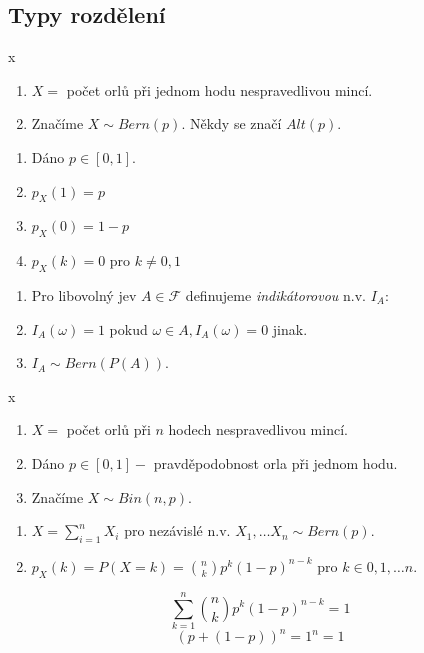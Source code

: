 \documentclass[../main.tex]{subfiles}
\begin{document}
\subsection{Typy rozdělení}
\begin{definition} {\color{white} x}
    \begin{enumerate}
        \item $X = $ počet orlů při jednom hodu nespravedlivou mincí.
        \item Značíme $X \sim Bern(p)$. Někdy se značí $Alt(p)$.
    \end{enumerate}

    \vspace{5mm}

    \begin{enumerate}
        \item Dáno $p \in [0,1]$.
        \item $p_X(1)=p$
        \item $p_X(0) = 1 - p$
        \item $p_X(k) = 0$ pro $k \neq 0,1$
    \end{enumerate}

    \vspace{5mm}

    \begin{enumerate}
        \item Pro libovolný jev $A \in \mathcal{F}$ definujeme \textit{indikátorovou} n.v. $I_A$:
        \item $I_A(\omega) = 1$ pokud $\omega \in A, I_A(\omega) = 0$ jinak.
        \item $I_A \sim  Bern(P(A))$.
    \end{enumerate}
\end{definition}

\begin{definition}
    {\color{white} x}
    \begin{enumerate}
        \item $X = $ počet orlů při $n$ hodech nespravedlivou mincí.
        \item Dáno $p \in [0,1] - $ pravděpodobnost orla při jednom hodu.
        \item Značíme $X \sim Bin(n,p)$. 
    \end{enumerate}
    \begin{enumerate}
        \item $X = \sum^n_{i=1}X_i$ pro nezávislé n.v. $X_1,\dots X_n \sim Bern(p)$.
        \item $p_X(k) = P(X = k) = \binom{n}{k}p^k(1-p)^{n-k}$ pro $k\in {0,1,\dots n}$.
    \end{enumerate}
    \[\sum^n_{k=1}\binom{n}{k}p^k(1-p)^{n-k} = 1\]
    \[(p + (1-p))^n = 1^n = 1\]
\end{definition}
\end{document}
